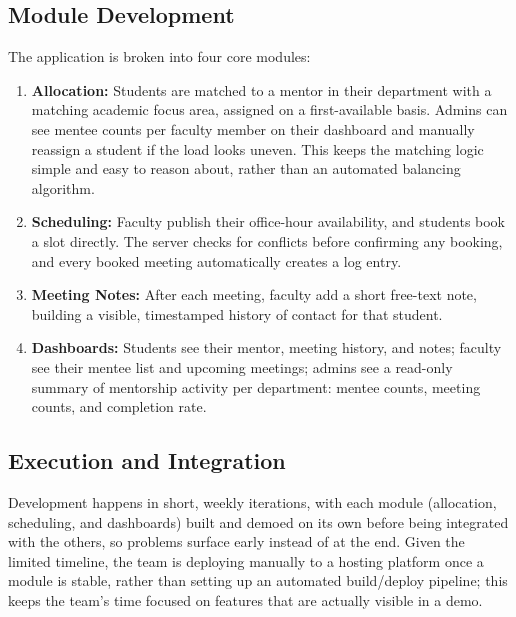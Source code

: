 \documentclass[11pt]{article}
\begin{document}
\subsection{Module Development}
The application is broken into four core modules:
\begin{enumerate}[leftmargin=1.4em, itemsep=0.2em]
  \item \textbf{Allocation:} Students are matched to a mentor in their department with a matching academic focus area, assigned on a first-available basis. Admins can see mentee counts per faculty member on their dashboard and manually reassign a student if the load looks uneven. This keeps the matching logic simple and easy to reason about, rather than an automated balancing algorithm.
  \item \textbf{Scheduling:} Faculty publish their office-hour availability, and students book a slot directly. The server checks for conflicts before confirming any booking, and every booked meeting automatically creates a log entry.
  \item \textbf{Meeting Notes:} After each meeting, faculty add a short free-text note, building a visible, timestamped history of contact for that student.
  \item \textbf{Dashboards:} Students see their mentor, meeting history, and notes; faculty see their mentee list and upcoming meetings; admins see a read-only summary of mentorship activity per department: mentee counts, meeting counts, and completion rate.
\end{enumerate}

\subsection{Execution and Integration}
Development happens in short, weekly iterations, with each module (allocation, scheduling, and dashboards) built and demoed on its own before being integrated with the others, so problems surface early instead of at the end. Given the limited timeline, the team is deploying manually to a hosting platform once a module is stable, rather than setting up an automated build/deploy pipeline; this keeps the team's time focused on features that are actually visible in a demo.
\end{document}
